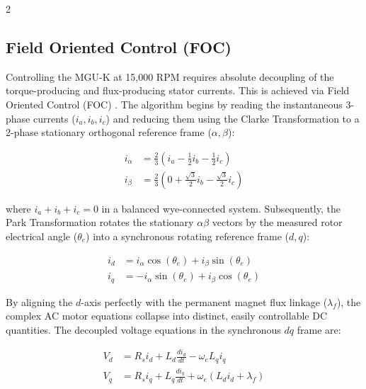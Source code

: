 \begin{multicols}{2}
\subsection{Field Oriented Control (FOC)}

Controlling the MGU-K at 15,000 RPM requires absolute decoupling of the torque-producing and flux-producing stator currents. This is achieved via Field Oriented Control (FOC) \cite{pmsm_foc_lit}. The algorithm begins by reading the instantaneous 3-phase currents ($i_a, i_b, i_c$) and reducing them using the Clarke Transformation to a 2-phase stationary orthogonal reference frame ($\alpha, \beta$):

\begin{equation} \label{eq:clarke_transform}
\begin{split}
i_\alpha &= \frac{2}{3} \left( i_a - \frac{1}{2}i_b - \frac{1}{2}i_c \right) \\
i_\beta &= \frac{2}{3} \left( 0 + \frac{\sqrt{3}}{2}i_b - \frac{\sqrt{3}}{2}i_c \right)
\end{split}
\end{equation}

where $i_a + i_b + i_c = 0$ in a balanced wye-connected system. Subsequently, the Park Transformation rotates the stationary $\alpha\beta$ vectors by the measured rotor electrical angle ($\theta_e$) into a synchronous rotating reference frame ($d, q$):

\begin{equation} \label{eq:park_transform}
\begin{split}
i_d &= i_\alpha \cos(\theta_e) + i_\beta \sin(\theta_e) \\
i_q &= -i_\alpha \sin(\theta_e) + i_\beta \cos(\theta_e)
\end{split}
\end{equation}

By aligning the $d$-axis perfectly with the permanent magnet flux linkage ($\lambda_f$), the complex AC motor equations collapse into distinct, easily controllable DC quantities. The decoupled voltage equations in the synchronous $dq$ frame are:

\begin{equation} \label{eq:dq_voltage}
\begin{split}
V_d &= R_s i_d + L_d \frac{di_d}{dt} - \omega_e L_q i_q \\
V_q &= R_s i_q + L_q \frac{di_q}{dt} + \omega_e (L_d i_d + \lambda_f)
\end{split}
\end{equation}


\end{multicols}
